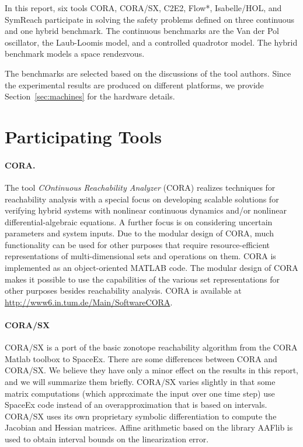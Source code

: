 \documentclass[EPiC]{easychair}
\begin{document}
In this report, six tools CORA, CORA/SX, C2E2, Flow*, Isabelle/HOL, and SymReach participate in solving the safety problems defined on three continuous and one hybrid benchmark. The continuous benchmarks are the Van der Pol oscillator, the Laub-Loomis model, and a controlled quadrotor model. The hybrid benchmark models a space rendezvous.

The benchmarks are selected based on the discussions of the tool authors. Since the experimental results are produced on different platforms, we provide Section~\ref{sec:machines} for the hardware details.



\section{Participating Tools}
\label{sect:tools}

\paragraph{CORA.} The tool \textit{COntinuous Reachability Analyzer} (CORA) \cite{Althoff2015a, Althoff2016a} realizes techniques for reachability analysis with a special focus on developing scalable solutions for verifying hybrid systems with nonlinear continuous dynamics and/or nonlinear differential-algebraic equations. A further focus is on considering uncertain parameters and system inputs. Due to the modular design of CORA, much functionality can be used for other purposes that require resource-efficient representations of multi-dimensional sets and operations on them. CORA is implemented as an object-oriented MATLAB code. The modular design of CORA makes it possible to use the capabilities of the various set representations for other purposes besides reachability analysis. CORA is available at \url{http://www6.in.tum.de/Main/SoftwareCORA}.

\paragraph{CORA/SX} CORA/SX is a port of the basic zonotope reachability algorithm from the CORA Matlab toolbox to SpaceEx. There are some differences between CORA and CORA/SX. We believe they have only a minor effect on the results in this report, and we will summarize them briefly. CORA/SX varies slightly in that some matrix computations (which approximate the input over one time step) use SpaceEx code instead of an overapproximation that is based on intervals. CORA/SX uses its own proprietary symbolic differentiation to compute the Jacobian and Hessian matrices. Affine arithmetic based on the library AAFlib \cite{grabowski2008analog} is used to obtain interval bounds on the linearization error.
\end{document}

